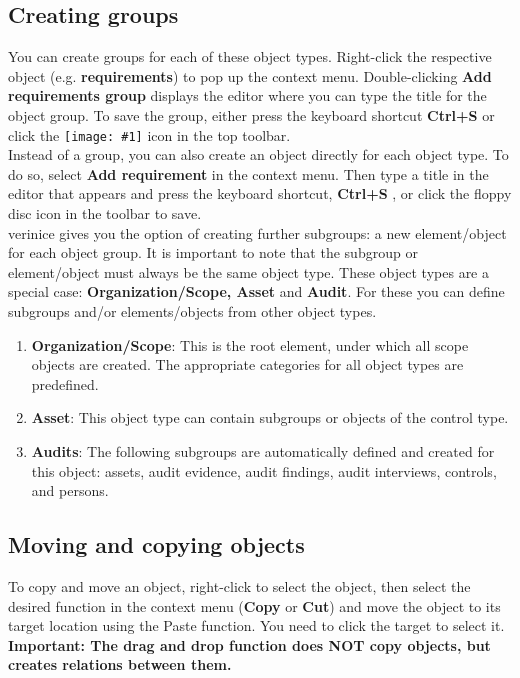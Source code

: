 \documentclass[a4paper,10pt]{book}
\newcommand{\icon}[1]{\texttt{[image: \#1]}}
\begin{document}
\subsection{Creating groups}
You can create groups for each of these object types. Right-click the respective object (e.g. \textbf{requirements}) to pop up the context menu. Double-clicking \textbf{Add requirements group}
displays the editor where you can type the title for the object group. To save the group, either
press the keyboard shortcut \textbf{Ctrl+S} or click the \icon{Icon/Disk.png}
icon in the top toolbar.
\newline\\
Instead of a group, you can also create an object directly for each object type. To do so, select
\textbf{Add requirement} in the context menu. Then type a title in the editor that appears
and press the keyboard shortcut, \textbf{Ctrl+S} , or click the floppy disc icon in the toolbar to save.
\newline\\
verinice gives you the option of creating further subgroups: a new element/object for each object group.
It is important to note that the subgroup or element/object must always be the same object type.
These object types are a special case: \textbf{Organization/Scope, Asset} and \textbf{Audit}.
For these you can define subgroups and/or elements/objects from other object types.
\begin{enumerate}
\item \textbf{Organization/Scope}: This is the root element, under which all scope objects are created. The appropriate categories for all object types are predefined.
\item \textbf{Asset}: This object type can contain subgroups or objects of the control type.
\item \textbf{Audits}: The following subgroups are automatically defined and created for this object: assets, audit evidence, audit findings, audit interviews, controls, and persons.
\end{enumerate}

\subsection{Moving and copying objects}
To copy and move an object, right-click to select the object, then select the desired function in the context menu
(\textbf{Copy} or \textbf{Cut}) and move the object to its target location using the Paste function. You need to click the
target to select it.
\newline\\
\textbf{Important: The drag and drop function does NOT copy objects, but creates relations between them.}
\end{document}
